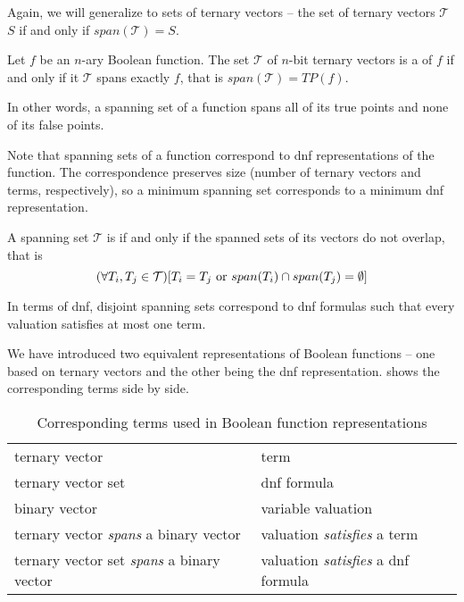 Again,
we will generalize 
to sets of ternary vectors
-- the set of ternary vectors $\mathcal{T}$
 $S$
if and only if
$span(\mathcal{T}) = S$.

\begin{definition}
Let $f$ be an $n$-ary Boolean function.
The set $\mathcal{T}$ of $n$-bit ternary vectors
is a  of $f$
if and only if
it $\mathcal{T}$ spans exactly $f$,
that is
$span(\mathcal{T}) = TP(f)$.
\end{definition}

In other words,
a spanning set of a function
spans all of its true points
and none of its false points.

Note that spanning sets of a function
correspond to \acrshort{dnf} representations
of the function.
The correspondence preserves size
(number of ternary vectors and terms, respectively),
so a minimum spanning set
corresponds to a minimum \acrshort{dnf} representation.

\begin{definition}
A spanning set $\mathcal{T}$ is 
if and only if the spanned sets of its vectors
do not overlap,
that is
\[
(\forall T_i, T_j \in \mathcal{T}) [T_i = T_j \text{ or }
span(T_i) \cap span(T_j) = \emptyset]
\]
\end{definition}

In terms of \acrshort{dnf},
disjoint spanning sets
correspond to \acrshort{dnf} formulas
such that every valuation satisfies at most one term.

We have introduced two equivalent representations
of Boolean functions --
one based on ternary vectors
and the other being the \acrshort{dnf} representation.
shows the corresponding terms side by side.

\begin{table}[h]
\centering
\begin{tabular}{ll}
ternary vector & term \\
ternary vector set & \acrshort{dnf} formula \\
binary vector & variable valuation \\
ternary vector \emph{spans} a binary vector &
valuation \emph{satisfies} a term \\
ternary vector set \emph{spans} a binary vector &
valuation \emph{satisfies} a \acrshort{dnf} formula
\end{tabular}
\caption{
Corresponding terms used
in Boolean function representations
}
\label{table:representations}
\end{table}

